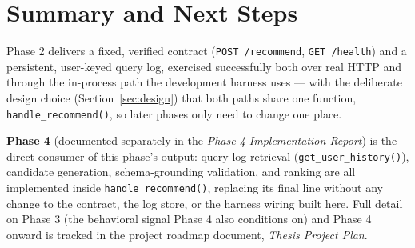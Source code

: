 \documentclass[11pt,a4paper]{article}
\newcommand{\code}[1]{\texttt{#1}}
\begin{document}
\section{Summary and Next Steps}

Phase 2 delivers a fixed, verified contract (\code{POST /recommend}, \code{GET /health}) and a
persistent, user-keyed query log, exercised successfully both over real HTTP and through the
in-process path the development harness uses --- with the deliberate design choice
(Section~\ref{sec:design}) that both paths share one function, \code{handle\_recommend()}, so later
phases only need to change one place.

\textbf{Phase 4} (documented separately in the \emph{Phase 4 Implementation Report}) is the direct
consumer of this phase's output: query-log retrieval (\code{get\_user\_history()}), candidate
generation, schema-grounding validation, and ranking are all implemented inside
\code{handle\_recommend()}, replacing its final line without any change to the contract, the log
store, or the harness wiring built here. Full detail on Phase 3 (the behavioral signal Phase 4 also
conditions on) and Phase 4 onward is tracked in the project roadmap document, \emph{Thesis Project
Plan}.
\end{document}
